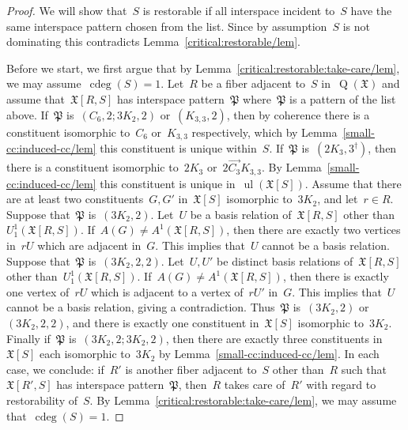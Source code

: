 \documentclass[english,a4paper]{article}
\theoremstyle{plain}
\theoremstyle{definition}
\newcommand{\coherentConfig}{\ensuremath{\mathfrak{X}}}
\newcommand{\interspace}[2]{\ensuremath{\coherentConfig[#1,#2]}}
\newcommand{\inducedCC}[1]{\ensuremath{\coherentConfig[#1]}}
\DeclareMathOperator*{\ul}{ul}
\DeclareMathOperator*{\Quotient}{Q}
\newcommand{\quotientGraph}[1]{\ensuremath{\Quotient(#1)}}
\DeclareMathOperator{\ColorDeg}{cdeg}
\newcommand{\colorDeg}[1]{\ensuremath{\ColorDeg\left(#1\right)}}
\newcommand{\ipsixMatching}             {\ensuremath{(\disjointCliques{3}{2},2)}}
\newcommand{\ipsixMatchingTwice}        {\ensuremath{(\disjointCliques{3}{2},2,2)}}
\newcommand{\ipsixMatchingMatching}     {\ensuremath{(\disjointCliques{3}{2},2;\disjointCliques{3}{2},2)}}
\newcommand{\ipsixMatchingAndCycle}     {\ensuremath{(\cycle{6},2;\disjointCliques{3}{2},2)}}
\newcommand{\ipsixTriangle}               {\ensuremath{(\disjointCliques{2}{3},3^\dag)}}
\newcommand{\ipsixTriangleComplement}     {\ensuremath{(\clique{3,3},2)}}
\newcommand{\clique}[1]{\ensuremath{K_{#1}}}
\newcommand{\cycle}[1]{\ensuremath{C_{#1}}}
\newcommand{\disjointCliques}[2]{\ensuremath{#1 \clique{#2}}}
\begin{document}
\begin{proof}
    We will show that~$S$ is restorable if all interspace incident to~$S$ have the same interspace pattern chosen from the list.
    Since by assumption~$S$ is not dominating this contradicts Lemma~\ref{critical:restorable/lem}.

    Before we start, we first argue that by Lemma~\ref{critical:restorable:take-care/lem}, we may assume~$\colorDeg{S} = 1$.
    Let~$R$ be a fiber adjacent to~$S$ in~$\quotientGraph{\coherentConfig}$ and assume that~$\interspace{R}{S}$ has interspace pattern~$\mathfrak{P}$ where~$\mathfrak{P}$ is a pattern of the list above.
    If~$\mathfrak{P}$ is~$\ipsixMatchingAndCycle$ or~$\ipsixTriangleComplement$, then by coherence there is a constituent isomorphic to~$\cycle{6}$ or~$\clique{3,3}$ respectively, which by Lemma~\ref{small-cc:induced-cc/lem} this constituent is unique within~$S$.
    If~$\mathfrak{P}$ is~$\ipsixTriangle$, then there is a constituent isomorphic to~$\disjointCliques{2}{3}$ or~$2\overrightarrow{C_3}\clique{3,3}$.
    By Lemma~\ref{small-cc:induced-cc/lem} this constituent is unique in~$\ul(\inducedCC{S})$.
    Assume that there are at least two constituents~$G,G'$ in~$\inducedCC{S}$ isomorphic to~$\disjointCliques{3}{2}$, and let~$r \in R$.
    Suppose that~$\mathfrak{P}$ is~$\ipsixMatching$.
    Let~$U$ be a basis relation of~$\interspace{R}{S}$ other than~$U^1_1(\interspace{R}{S})$.
    If~$A(G) \neq A^1(\interspace{R}{S})$, then there are exactly two vertices in~$rU$ which are adjacent in~$G$.
    This implies that~$U$ cannot be a basis relation.
    Suppose that~$\mathfrak{P}$ is~$\ipsixMatchingTwice$.
    Let~$U,U'$ be distinct basis relations of~$\interspace{R}{S}$ other than~$U^1_1(\interspace{R}{S})$.
    If~$A(G) \neq A^1(\interspace{R}{S})$, then there is exactly one vertex of~$rU$ which is adjacent to a vertex of~$rU'$ in~$G$.
    This implies that~$U$ cannot be a basis relation, giving a contradiction.
    Thus~$\mathfrak{P}$ is~$\ipsixMatching$ or~$\ipsixMatchingTwice$, and there is exactly one constituent in~$\inducedCC{S}$ isomorphic to~$\disjointCliques{3}{2}$.
    Finally if~$\mathfrak{P}$ is~$\ipsixMatchingMatching$, then there are exactly three constituents in~$\inducedCC{S}$ each isomorphic to~$\disjointCliques{3}{2}$ by Lemma~\ref{small-cc:induced-cc/lem}.
    In each case, we conclude: if~$R'$ is another fiber adjacent to~$S$ other than~$R$ such that~$\interspace{R'}{S}$ has interspace pattern~$\mathfrak{P}$, then~$R$ takes care of~$R'$ with regard to restorability of~$S$.
    By Lemma~\ref{critical:restorable:take-care/lem}, we may assume that~$\colorDeg{S} = 1$.


\end{proof}
\end{document}
